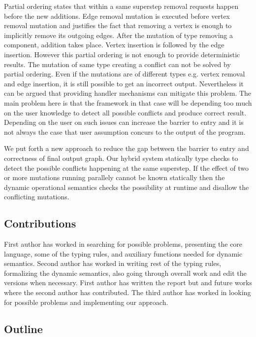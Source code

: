 Partial ordering states that within a same superstep removal requests happen before the new additions. Edge removal mutation is executed before vertex removal mutation and justifies the fact that removing a vertex is enough to implicitly remove its outgoing edges. After the mutation of type removing a component, addition takes place. Vertex insertion is followed by the edge insertion. However this partial ordering is not enough to provide deterministic results. The mutation of same type creating a conflict can not be solved by partial ordering. Even if the mutations are of different types e.g. vertex removal and edge insertion, it is still possible to get an incorrect output. Nevertheless it can be argued that providing handler mechanisms can mitigate this problem. The main problem here is that the framework in that case will be depending too much on the user knowledge to detect all possible conflicts and produce correct result. Depending on the user on such issues can increase the barrier to entry and it is not always the case that user assumption concurs to the output of the program.


We put forth a new approach to reduce the gap between the barrier to entry and correctness of final output graph. Our hybrid system statically type checks to detect the possible conflicts happening at the same superstep. If the effect of two or more mutations running parallely cannot be known statically then the dynamic operational semantics checks the possibility at runtime and disallow the conflicting mutations. 



\subsection{Contributions}
\label{subsec:contrib}

First author has worked in searching for possible problems, presenting the core language, some of the typing rules, and auxiliary functions needed for dynamic semantics. Second author has worked in writing rest of the typing rules, formalizing the dynamic semantics, also going through overall work and edit the versions when necessary. First author has written the report but  and future works where the second author has contributed. The third author has worked in looking for possible problems and implementing our approach.


\subsection{Outline}
\label{subsec:outline}

